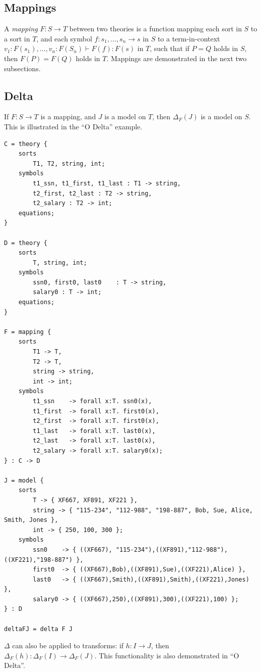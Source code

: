 \documentclass[12pt]{article}
\begin{document}
\subsection{Mappings}

A {\it mapping} $F : S \to T$ between two theories is a function mapping each sort in $S$ to a sort in $T$, and each symbol $f : s_1, \ldots, s_n \to s$ in $S$ to a term-in-context $v_1 : F(s_1), \ldots, v_n : F(S_n) \vdash F(f) : F(s)$ in $T$, such that if $P = Q$ holds in $S$, then $F(P) = F(Q)$ holds in $T$.  Mappings are demonstrated in the next two subsections.

\subsection{Delta}

If $F : S \to T$ is a mapping, and $J$ is a model on $T$, then $\Delta_F(J)$ is a model on $S$.  This is illustrated in the ``O Delta'' example.
\begin{verbatim}
C = theory {
 	sorts 
		T1, T2, string, int;
 	symbols
		t1_ssn, t1_first, t1_last : T1 -> string,
		t2_first, t2_last : T2 -> string,
		t2_salary : T2 -> int;
 	equations; 
}

D = theory {
 	sorts 
		T, string, int;
 	symbols
		ssn0, first0, last0    : T -> string,
		salary0 : T -> int;
 	equations;
}

F = mapping {
 	sorts 
		T1 -> T,
		T2 -> T,
		string -> string,
		int -> int;
 	symbols
		t1_ssn    -> forall x:T. ssn0(x),
		t1_first  -> forall x:T. first0(x),
		t2_first  -> forall x:T. first0(x),
		t1_last   -> forall x:T. last0(x),
		t2_last   -> forall x:T. last0(x),
		t2_salary -> forall x:T. salary0(x);
} : C -> D

J = model {
	sorts 
		T -> { XF667, XF891, XF221 },
		string -> { "115-234", "112-988", "198-887", Bob, Sue, Alice, Smith, Jones },
		int -> { 250, 100, 300 };
 	symbols
		ssn0    -> { ((XF667), "115-234"),((XF891),"112-988"),((XF221),"198-887") },
		first0  -> { ((XF667),Bob),((XF891),Sue),((XF221),Alice) },
		last0   -> { ((XF667),Smith),((XF891),Smith),((XF221),Jones) },
		salary0 -> { ((XF667),250),((XF891),300),((XF221),100) };
} : D 

deltaFJ = delta F J
\end{verbatim}

$\Delta$ can also be applied to transforms: if $h : I \to J$, then $\Delta_F(h) : \Delta_F(I) \to \Delta_F(J)$.  This functionality is also demonstrated in ``O Delta''.
\end{document}
